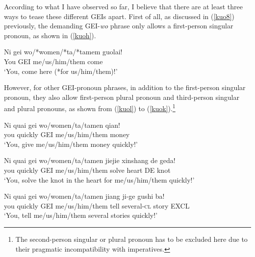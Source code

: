 \documentclass[output=paper,colorlinks,citecolor=brown]{langscibook}
\begin{document}
According to what I have observed so far, I believe that there are at least three ways to tease these different GEIs apart. First of all, as discussed in (\ref{kuo8}) previously, the demanding GEI-\textit{wo} phrase only allows a first-person singular pronoun, as shown in (\ref{kuoh}). 

\ea
\label{kuoh}
\gll Ni     gei wo/*women/*ta/*tamem    guolai!\\  
     You    GEI me/us/him/them          come\\ 
\glt `You, come here (*for us/him/them)!'
\z

However, for other GEI-pronoun phrases, in addition to the first-person singular pronoun, they also allow first-person plural pronoun and third-person singular and plural pronouns, as shown from (\ref{kuol}) to (\ref{kuok}).\footnote{The second-person singular or plural pronoun has to be excluded here due to their pragmatic incompatibility with imperatives.}

\ea
\label{kuol}
\gll Ni     quai    gei wo/women/ta/tamen   qian!\\  
     you    quickly GEI me/us/him/them      money\\ 
\glt `You, give me/us/him/them money quickly!'
\z

\ea
\label{kuoj}
\gll Ni     quai    gei wo/women/ta/tamen   jiejie  xinshang    de  geda!\\  
     you    quickly GEI me/us/him/them      solve   heart       DE  knot\\ 
\glt `You, solve the knot in the heart for me/us/him/them quickly!'
\z

\ea
\label{kuok}
\gll Ni     quai    gei wo/women/ta/tamen   jiang   ji-ge       gushi   ba!\\  
     you    quickly GEI me/us/him/them      tell    several-\textsc{cl}  story   EXCL\\ 
\glt `You, tell me/us/him/them several stories quickly!'
\z
\end{document}
